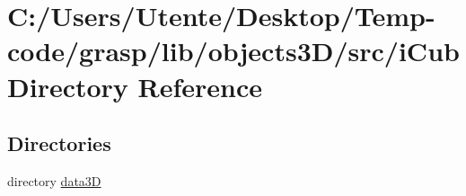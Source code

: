 \section{C\+:/\+Users/\+Utente/\+Desktop/\+Temp-\/code/grasp/lib/objects3\+D/src/i\+Cub Directory Reference}
\label{dir_fad77f832006d3d52c3c8fd0948a1b45}
\subsection*{Directories}
\begin{DoxyCompactItemize}
\item 
directory \hyperlink{dir_17976015326c068e5ef521d196489202}{data3\+D}
\end{DoxyCompactItemize}

